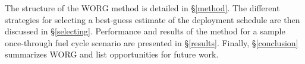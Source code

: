 The structure of the WORG method is detailed in \S\ref{method}. 
The different strategies for selecting a best-guess estimate of the 
deployment schedule are then discussed in \S\ref{selecting}. Performance
and results of the method for a sample once-through fuel cycle scenario 
are presented in \S\ref{results}. Finally, \S\ref{conclusion} summarizes
WORG and list opportunities for future work.
